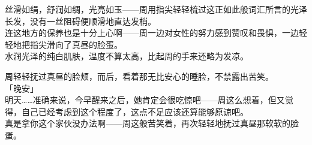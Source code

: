 丝滑如绢，舒润如绸，光亮如玉——周用指尖轻轻梳过这正如此般词汇所言的光泽长发，没有一丝阻碍便顺滑地直达发梢。\\

连这地方的保养也是十分上心啊——周一边对女性的努力感到赞叹和畏惧，一边轻轻地把指尖滑向了真昼的脸蛋。\\

水润光泽的纯白肌肤，温度不算太高，比起周的手来还略为发凉。

周轻轻抚过真昼的脸颊，而后，看着那无比安心的睡脸，不禁露出苦笑。\\

「晚安」\\

明天……准确来说，今早醒来之后，她肯定会很吃惊吧——周这么想着，但又觉得，自己已经考虑到这个程度了，这点不足应该还算能够原谅吧。\\

真是拿你这个家伙没办法啊——周这般苦笑着，再次轻轻地抚过真昼那软软的脸蛋。

